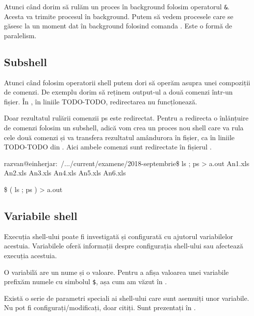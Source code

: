 Atunci când dorim să rulăm un proces în background folosim operatorul \texttt{\&}. Acesta
va trimite procesul în background. Putem să vedem procesele care se găsesc la un
moment dat în background folosind comanda . Este o formă de paralelism.

\subsection{Subshell}
\label{sec:cli-subshell}

Atunci când folosim operatorii shell putem dori să operăm asupra unei compoziții
de comenzi. De exemplu dorim să reținem output-ul a două comenzi într-un fișier. În , în liniile TODO-TODO, redirectarea nu funcțîonează.

Doar rezultatul rulării comenzii ps este redirectat. Pentru a redirecta o
înlănțuire de comenzi folosim un subshell, adică vom crea un proces nou shell
care va rula cele două comenzi și va transfera rezultatul amândurora în fișier, ca în liniile TODO-TODO din . Aici ambele comenzi sunt redirectate în fișierul .

\begin{screen}[caption={Subshell-uri și redirectare},label={lst:cli:subshell}]
razvan@einherjar:~/.../current/examene/2018-septembrie\$ ls ; ps > a.out
An1.xls  An2.xls  An3.xls  An4.xls  An5.xls  An6.xls

\$ ( ls ; ps ) > a.out
\end{screen}

\subsection{Variabile shell}
\label{sec:cli-shell-variable}

Execuția shell-ului poate fi investigată și configurată cu ajutorul variabilelor
acestuia. Variabilele oferă informații despre configurația shell-ului sau
afectează execuția acestuia.

O variabilă are un nume și o valoare. Pentru a afișa valoarea unei variabile
prefixăm numele cu simbolul \texttt{\$}, așa cum am văzut în .

Există o serie de parametri speciali ai shell-ului care sunt asemuiți unor
variabile. Nu pot fi configurați/modificați, doar citiți. Sunt prezentați în .

